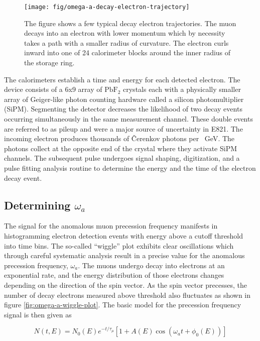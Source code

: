 \begin{figure}
\centering
\texttt{[image: fig/omega-a-decay-electron-trajectory]}
\caption{
    The figure shows a few typical decay electron trajectories.  The muon decays into an electron with lower momentum which by necessity takes a path with a smaller radius of curvature.  The electron curls inward into one of 24 calorimeter blocks around the inner radius of the storage ring. 
    \label{fig:omega-a-decay-electron-trajectory}
}
\end{figure}

The calorimeters establish a time and energy for each detected electron.  The device consists of a 6x9 array of $\mathrm{PbF_2}$ crystals each with a physically smaller array of Geiger-like photon counting hardware called a silicon photomultiplier (SiPM).  Segmenting the detector decreases the likelihood of two decay events occurring simultaneously in the same measurement channel.  These double events are referred to as pileup and were a major source of uncertainty in E821.  The incoming electron produces thousands of \v{C}erenkov photons per \SI{}{\GeV}.  The photons collect at the opposite end of the crystal where they activate SiPM channels.  The subsequent pulse undergoes signal shaping, digitization, and a pulse fitting analysis routine to determine the energy and the time of the electron decay event.  

\subsection{Determining $\omega_a$}

The signal for the anomalous muon precession frequency manifests in histogramming electron detection events with energy above a cutoff threshold into time bins. The so-called ``wiggle'' plot exhibits clear oscillations which through careful systematic analysis result in a precise value for the anomalous precession frequency, $\omega_a$.  The muons undergo decay into electrons at an exponential rate, and the energy distribution of those electrons changes depending on the direction of the spin vector.  As the spin vector precesses, the number of decay electrons measured above threshold also fluctuates as shown in figure \ref{fig:omega-a-wiggle-plot}.  The basic model for the precession frequency signal is then given as 

\begin{equation}
\label{eqn:omega-a-signal}
N(t, E) = N_0(E) e^{-t/\tau_\mu} \left[ 1 + A(E) \cos(\omega_a t + \phi_0(E))\right]
\end{equation}

